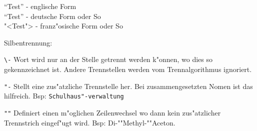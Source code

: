 \documentclass[10pt, a4paper]{article}
\begin{document}
``Test''  - englische Form\\
"`Test"'  - deutsche Form oder \glqq So\grqq \\ %
"<Test"> - franz"osische Form oder \flqq So\frqq %

\vspace{1cm}
Silbentrennung:

\verb+\-+ \quad Wort wird nur an der Stelle getrennt werden k"onnen, wo dies so gekennzeichnet ist. Andere
Trennstellen werden vom Trennalgorithmus ignoriert.

\verb+"-+ \quad Stellt eine zus"atzliche Trennstelle her. Bei zusammengesetzten Nomen ist das hilfreich.
Bsp: \verb+Schulhaus"-verwaltung+

\verb+""+ \quad Definiert einen m"oglichen Zeilenwechsel wo dann kein zus"atzlicher Trennstrich eingef"ugt wird.
Bsp: Di-""Methyl-""Aceton.
\end{document}
